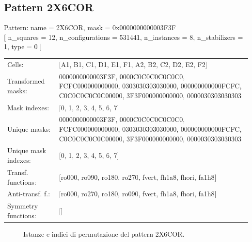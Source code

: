 \newpage

\subsection{Pattern 2X6COR}

\begin{tcolorbox}[sharp corners, fontupper=\ttfamily\small, colback=white]
  \noindent Pattern: name = 2X6COR, mask = 0x0000000000003F3F\\
  {[} n\_squares = 12, n\_configurations = 531441,
  n\_instances = 8, n\_stabilizers = 1, type = 0 { ]}\\[1.0ex]
  \begin{tabularx}{\textwidth}{@{} p{3.5cm} X @{}}
    Cells:               & {[}A1, B1, C1, D1, E1, F1, A2, B2, C2, D2, E2, F2{]}\\[0.5ex]
    Transformed masks:   & 0000000000003F3F, 0000C0C0C0C0C0C0, FCFC000000000000, 0303030303030000, 000000000000FCFC, C0C0C0C0C0C00000, 3F3F000000000000, 0000030303030303\\[0.5ex]
    Mask indexes:        & {[}0, 1, 2, 3, 4, 5, 6, 7{]}\\[0.5ex]
    Unique masks:        & 0000000000003F3F, 0000C0C0C0C0C0C0, FCFC000000000000, 0303030303030000, 000000000000FCFC, C0C0C0C0C0C00000, 3F3F000000000000, 0000030303030303\\[0.5ex]
    Unique mask indexes: & {[}0, 1, 2, 3, 4, 5, 6, 7{]}\\[0.5ex]
    Transf. functions:   & {[}ro000, ro090, ro180, ro270, fvert, fh1a8, fhori, fa1h8{]}\\[0.5ex]
    Anti-transf. f.:     & {[}ro000, ro270, ro180, ro090, fvert, fh1a8, fhori, fa1h8{]}\\[0.5ex]
    Symmetry functions:  & {[}{]}\\[0.5ex]
  \end{tabularx}
\end{tcolorbox}

\begin{figure}[htbp]
  \centering
   \hfill
   \hfill
   \hfill
  \vspace{0.3cm}
   \hfill
   \hfill
   \hfill
  \caption{Istanze e indici di permutazione del pattern 2X6COR.}
\end{figure}

